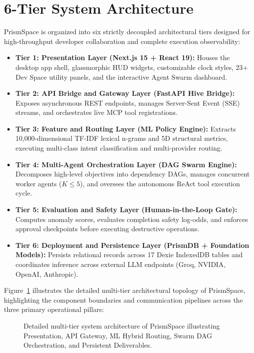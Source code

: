 \documentclass[12pt,a4paper]{report}
\begin{document}
\section{6-Tier System Architecture}
PrismSpace is organized into six strictly decoupled architectural tiers designed for high-throughput developer collaboration and complete execution observability:
\begin{itemize}\setlength{\itemsep}{1.5pt}\setlength{\parsep}{0pt}\setlength{\topsep}{2pt}
    \item \textbf{Tier 1: Presentation Layer (Next.js 15 + React 19):} Houses the desktop app shell, glassmorphic HUD widgets, customizable clock styles, 23+ Dev Space utility panels, and the interactive Agent Swarm dashboard.
    \item \textbf{Tier 2: API Bridge and Gateway Layer (FastAPI Hive Bridge):} Exposes asynchronous REST endpoints, manages Server-Sent Event (SSE) streams, and orchestrates live MCP tool registrations.
    \item \textbf{Tier 3: Feature and Routing Layer (ML Policy Engine):} Extracts 10,000-dimensional TF-IDF lexical n-grams and 5D structural metrics, executing multi-class intent classification and multi-provider routing.
    \item \textbf{Tier 4: Multi-Agent Orchestration Layer (DAG Swarm Engine):} Decomposes high-level objectives into dependency DAGs, manages concurrent worker agents ($K \le 5$), and oversees the autonomous ReAct tool execution cycle.
    \item \textbf{Tier 5: Evaluation and Safety Layer (Human-in-the-Loop Gate):} Computes anomaly scores, evaluates completion safety log-odds, and enforces approval checkpoints before executing destructive operations.
    \item \textbf{Tier 6: Deployment and Persistence Layer (PrismDB + Foundation Models):} Persists relational records across 17 Dexie IndexedDB tables and coordinates inference across external LLM endpoints (Groq, NVIDIA, OpenAI, Anthropic).
\end{itemize}

Figure~\ref{fig:system_arch_detailed} illustrates the detailed multi-tier architectural topology of PrismSpace, highlighting the component boundaries and communication pipelines across the three primary operational pillars:

\begin{figure}[H]
    \centering
    \caption{Detailed multi-tier system architecture of PrismSpace illustrating Presentation, API Gateway, ML Hybrid Routing, Swarm DAG Orchestration, and Persistent Deliverables.}
    \label{fig:system_arch_detailed}
\end{figure}
\end{document}
